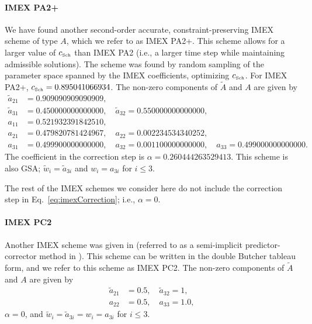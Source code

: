 \paragraph{IMEX PA2+}

We have found another second-order accurate, constraint-preserving IMEX scheme of type $A$, which we refer to as IMEX PA2+.  
This scheme allows for a larger value of $c_{\mbox{\tiny Sch}}$ than IMEX PA2 (i.e., a larger time step while maintaining admissible solutions).  
The scheme was found by random sampling of the parameter space spanned by the IMEX coefficients, optimizing $c_{\mbox{\tiny Sch}}$.  
For IMEX PA2+, $c_{\mbox{\tiny Sch}} = 0.895041066934$. 
The non-zero components of $\tilde{A}$ and $A$ are given by
\begin{align*}
  \tilde{a}_{21} &= 0.909090909090909, \\
  \tilde{a}_{31} &= 0.450000000000000, \quad \tilde{a}_{32} = 0.550000000000000, \\
  a_{11} &= 0.521932391842510, \\
  a_{21} &= 0.479820781424967, \quad a_{22} = 0.002234534340252, \\
  a_{31} &= 0.499900000000000, \quad a_{32} = 0.001100000000000, \quad a_{33} = 0.499000000000000.
\end{align*}
The coefficient in the correction step is $\alpha = 0.260444263529413$.  
This scheme is also GSA; $\tilde{w}_{i}=\tilde{a}_{3i}$ and $w_{i}=a_{3i}$ for $i\le3$.  

The rest of the IMEX schemes we consider here do not include the correction step in Eq.~\eqref{eq:imexCorrection}; i.e., $\alpha=0$.  

\paragraph{IMEX PC2}

Another IMEX scheme was given in \cite{mcclarren_etal_2008} (referred to as a semi-implicit predictor-corrector method in \cite{mcclarren_etal_2008}).  
This scheme can be written in the double Butcher tableau form, and we refer to this scheme as IMEX PC2.  
The non-zero components of $\tilde{A}$ and $A$ are given by
\begin{align*}
  \tilde{a}_{21} &= 0.5, \quad \tilde{a}_{32} = 1, \\
  a_{22} &= 0.5, \quad a_{33} = 1.0,
\end{align*}
$\alpha=0$, and $\tilde{w}_{i}=\tilde{a}_{3i} = w_{i}=a_{3i}$ for $i\le3$.

